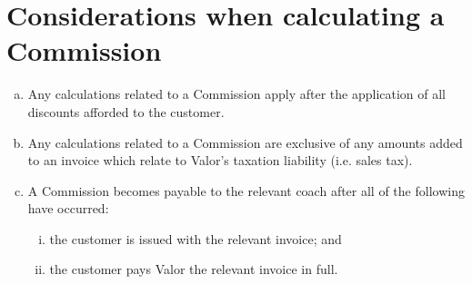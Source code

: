 \documentclass[10pt]{article}
\begin{document}
\section{Considerations when calculating a Commission}
\begin{enumerate}[(a)]
	\item Any calculations related to a Commission apply after the application of all discounts afforded to the customer.

	\item Any calculations related to a Commission are exclusive of any amounts added to an invoice which relate to Valor's taxation liability (i.e. sales tax).

	\item A Commission becomes payable to the relevant coach after all of the following have occurred:

	\begin{enumerate}[(i)]
		\item the customer is issued with the relevant invoice; and

		\item the customer pays Valor the relevant invoice in full.
	\end{enumerate}
\end{enumerate}
\end{document}
